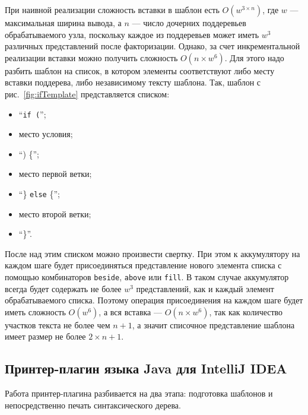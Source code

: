   

При наивной реализации сложность вставки в шаблон есть
$O(w^{3\times n})$, где $w$ --- максимальная ширина вывода,
а $n$ --- число дочерних поддеревьев обрабатываемого узла,
поскольку каждое из поддеревьев может иметь $w^3$ различных
представлений после факторизации.
Однако, за счет инкрементальной реализации вставки
можно получить сложность $O(n \times w^6)$.
Для этого надо разбить шаблон на список, в котором элементы соответствуют
либо месту вставки поддерева, либо независимому тексту шаблона. Так, шаблон
с рис.~\ref{fig:ifTemplate} представляется списком:
\begin{itemize}
  \item ``\lstinline{if (}'';
  \item место условия;
  \item ``) \{'';
  \item место первой ветки;
  \item ``\} \lstinline{else} \{'';
  \item место второй ветки;
  \item ``\}''.
\end{itemize}

После над этим списком можно произвести свертку. При этом к аккумулятору на каждом
шаге будет присоединяться представление нового элемента списка с помощью
комбинаторов \lstinline{beside}, \lstinline{above} или \lstinline{fill}. 
В таком случае аккумулятор всегда будет содержать не более
$w^3$ представлений, как и каждый элемент обрабатываемого списка.
Поэтому операция присоединения
на каждом шаге будет иметь сложность $O(w^6)$, а вся вставка ---
$O(n \times w^6)$, так как количество участков текста не более чем $n + 1$, а значит
списочное представление шаблона имеет размер не более $2 \times n + 1$.

\newpage
\subsection{Принтер-плагин языка Java для IntelliJ IDEA}

Работа принтер-плагина разбивается на два этапа: подготовка шаблонов и непосредственно
печать синтаксического дерева.

